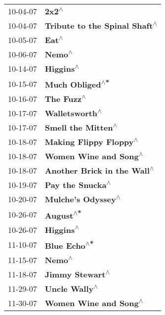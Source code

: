 \begin{supertabular}{p{0.25\columnwidth}p{0.75\columnwidth}}
 10-04-07 &                                 \textbf{2x2\textsuperscript{$\wedge$}} \\
 10-04-07 &         \textbf{Tribute to the Spinal Shaft\textsuperscript{$\wedge$}} \\
 10-05-07 &                                 \textbf{Eat\textsuperscript{$\wedge$}} \\
 10-06-07 &                                \textbf{Nemo\textsuperscript{$\wedge$}} \\
 10-14-07 &                             \textbf{Higgins\textsuperscript{$\wedge$}} \\
 10-15-07 &                       \textbf{Much Obliged\textsuperscript{$\wedge$*}} \\
 10-16-07 &                            \textbf{The Fuzz\textsuperscript{$\wedge$}} \\
 10-17-07 &                        \textbf{Walletsworth\textsuperscript{$\wedge$}} \\
 10-17-07 &                    \textbf{Smell the Mitten\textsuperscript{$\wedge$}} \\
 10-18-07 &                \textbf{Making Flippy Floppy\textsuperscript{$\wedge$}} \\
 10-18-07 &                 \textbf{Women Wine and Song\textsuperscript{$\wedge$}} \\
 10-18-07 &           \textbf{Another Brick in the Wall\textsuperscript{$\wedge$}} \\
 10-19-07 &                      \textbf{Pay the Snucka\textsuperscript{$\wedge$}} \\
 10-20-07 &                    \textbf{Mulche's Odyssey\textsuperscript{$\wedge$}} \\
 10-26-07 &                             \textbf{August\textsuperscript{$\wedge$*}} \\
 10-26-07 &                             \textbf{Higgins\textsuperscript{$\wedge$}} \\
 11-10-07 &                          \textbf{Blue Echo\textsuperscript{$\wedge$*}} \\
 11-15-07 &                                \textbf{Nemo\textsuperscript{$\wedge$}} \\
 11-18-07 &                       \textbf{Jimmy Stewart\textsuperscript{$\wedge$}} \\
 11-29-07 &                         \textbf{Uncle Wally\textsuperscript{$\wedge$}} \\
 11-30-07 &                 \textbf{Women Wine and Song\textsuperscript{$\wedge$}} \\

\end{supertabular}

